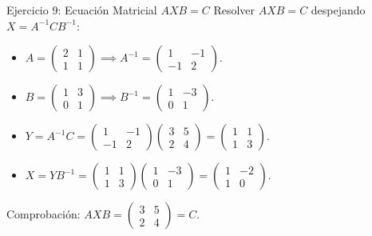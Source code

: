 \documentclass[11pt]{beamer}
\begin{document}
\begin{frame}{Ejercicio 9: Ecuación Matricial $A X B = C$}
  Resolver $AXB = C$ despejando $X = A^{-1} C B^{-1}$:
  \begin{itemize}
    \item $A = \begin{pmatrix} 2 & 1 \\ 1 & 1 \end{pmatrix} \implies A^{-1} = \begin{pmatrix} 1 & -1 \\ -1 & 2 \end{pmatrix}$.
    \item $B = \begin{pmatrix} 1 & 3 \\ 0 & 1 \end{pmatrix} \implies B^{-1} = \begin{pmatrix} 1 & -3 \\ 0 & 1 \end{pmatrix}$.
    \item $Y = A^{-1} C = \begin{pmatrix} 1 & -1 \\ -1 & 2 \end{pmatrix} \begin{pmatrix} 3 & 5 \\ 2 & 4 \end{pmatrix} = \begin{pmatrix} 1 & 1 \\ 1 & 3 \end{pmatrix}$.
    \item $X = Y B^{-1} = \begin{pmatrix} 1 & 1 \\ 1 & 3 \end{pmatrix} \begin{pmatrix} 1 & -3 \\ 0 & 1 \end{pmatrix} = \begin{pmatrix} 1 & -2 \\ 1 & 0 \end{pmatrix}$.
  \end{itemize}
  \vfill
  Comprobación: $A X B = \begin{pmatrix} 3 & 5 \\ 2 & 4 \end{pmatrix} = C$. \checkmark
\end{frame}
\end{document}
